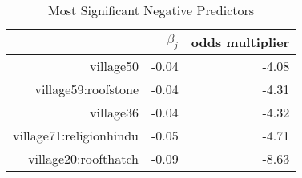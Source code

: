 \begin{table}[ht]
\centering
\begin{tabular}{rrr}
  \hline
 & $\beta_j$ & odds multiplier \\ 
  \hline
village50 & -0.04 & -4.08 \\ 
  village59:roofstone & -0.04 & -4.31 \\ 
  village36 & -0.04 & -4.32 \\ 
  village71:religionhindu & -0.05 & -4.71 \\ 
  village20:roofthatch & -0.09 & -8.63 \\ 
   \hline
\end{tabular}
\caption{Most Significant Negative Predictors} 
\label{tab:neg}
\end{table}
